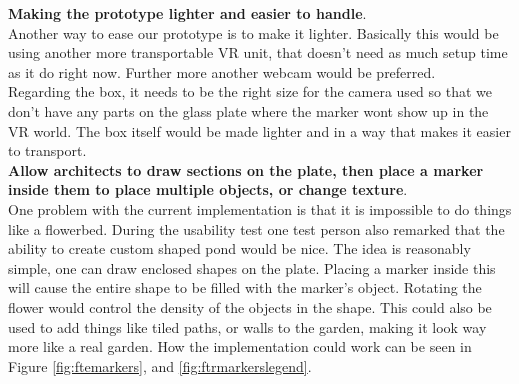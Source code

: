 \textbf{Making the prototype lighter and easier to handle}.\\
Another way to ease our prototype is to make it lighter. Basically this would be using another more transportable VR unit, that doesn't need as much setup time as it do right now. Further more another webcam would be preferred.\\
Regarding the box, it needs to be the right size for the camera used so that we don't have any parts on the glass plate where the marker wont show up in the VR world. The box itself would be made lighter and in a way that makes it easier to transport.\\

\textbf{Allow architects to draw sections on the plate, then place a marker inside them to place multiple objects, or change texture}.\\ One problem with the current implementation is that it is impossible to do things like a flowerbed. During the usability test one test person also remarked that the ability to create custom shaped pond would be nice. The idea is reasonably simple, one can draw enclosed shapes on the plate. Placing a marker inside this will cause the entire shape to be filled with the marker's object. Rotating the flower would control the density of the objects in the shape. This could also be used to add things like tiled paths, or walls to the garden, making it look way more like a real garden. How the implementation could work can be seen in Figure \ref{fig:ftemarkers}, and \ref{fig:ftrmarkerslegend}.
